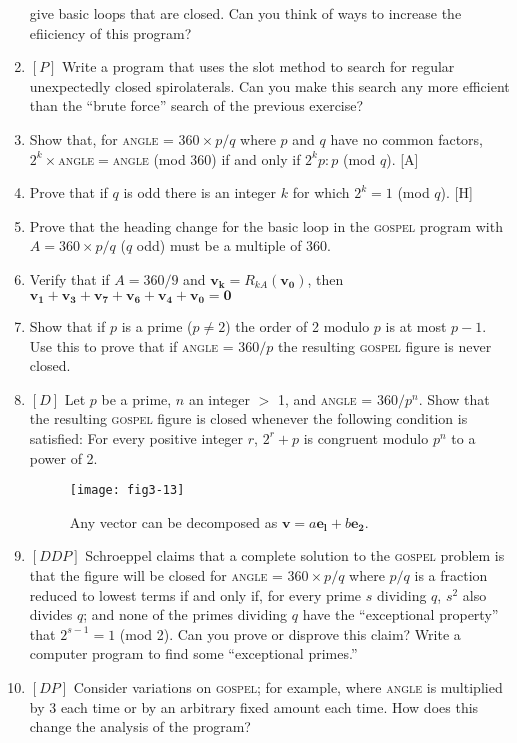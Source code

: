 \documentclass{book}
\begin{document}
\begin{enumerate}
give basic loops that are closed. Can you think of ways to increase the
efiiciency of this program?
\item $[P]$ Write a program that uses the slot method to search for regular
unexpectedly closed spirolaterals. Can you make this search any more
efficient than the ``brute force'' search of the previous exercise?
\item Show that, for \textsc{angle} = $360 \times p/ q$ where $p$ and $q$ have no common
factors, $2^{k} \times$\textsc{angle}$=$\textsc{angle} (mod 360) if and only if $2^kp : p$ (mod $q$). [A]
\item Prove that if $q$ is odd there is an integer $k$ for which $2^k = 1$ (mod $q$).
[H]
\item Prove that the heading change for the basic loop in the \textsc{gospel}
program with $A = 360 \times p/q$ ($q$ odd) must be a multiple of 360.  
\item Verify that if $A = 360/9$ and $\mathbf{v_k} = R_{kA}(\mathbf{v_0})$, then
$\mathbf{v_1} + \mathbf{v_3} + \mathbf{v_7} + \mathbf{v_6} + \mathbf{v_4} + \mathbf{v_0} = \mathbf{0}$  
\item Show that if $p$ is a prime ($p \not=  2$) the order of 2 modulo $p$ is at most
$p - 1$. Use this to prove that if \textsc{angle} = $360/p$ the resulting \textsc{gospel}
figure is never closed.  
\item $[D]$ Let $p$ be a prime, $n$ an integer $>$ 1, and \textsc{angle} = $360/p^n$.
Show that the resulting \textsc{gospel} figure is closed whenever the following
condition is satisfied: For every positive integer $r$, $2^r + p$ is congruent
modulo $p^n$ to a power of 2.

\begin{figure}
\begin{center}
\texttt{[image: fig3-13]}
\caption{Any vector can be decomposed as $\mathbf{v} = a\mathbf{e_l} + b\mathbf{e_2}$.}
\end{center}
\end{figure}

\item $[DDP]$ Schroeppel claims that a complete solution to the \textsc{gospel}
problem is that the figure will be closed for \textsc{angle} = $360 \times p/q$ where
$p/q$ is a fraction reduced to lowest terms if and only if, for every prime $s$
dividing $q$, $s^2$ also divides $q$; and none of the primes dividing $q$ have the
``exceptional property'' that $2^{s-1} = 1$ (mod 2). Can you prove or
disprove this claim? Write a computer program to find some ``exceptional
primes.''
\item $[DP]$ Consider variations on \textsc{gospel}; for example, where \textsc{angle} is
multiplied by 3 each time or by an arbitrary fixed amount each time.
How does this change the analysis of the program?
\end{enumerate}
\end{document}
